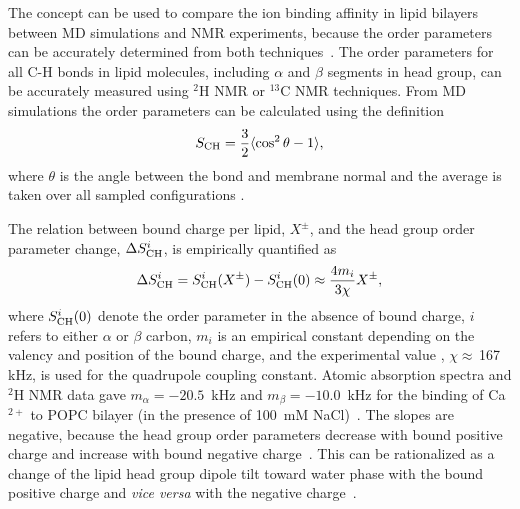 \documentclass[aip,jcp,twocolumn]{revtex4}
\begin{document}
The concept can be used to compare the ion binding affinity in lipid 
bilayers between MD simulations and  NMR experiments, because the order
parameters can be accurately determined from both techniques~\cite{ollila16}.
The order parameters for all C-H bonds in lipid molecules, including
$\alpha$ and $\beta$ segments in head group, can be accurately measured
using $^2$H NMR or $^{13}$C NMR techniques. From MD simulations the
order parameters can be calculated using the definition
\begin{equation}\label{OP}
S_{\rm CH}=\frac{3}{2}\langle \cos^2\theta -1 \rangle,
\end{equation}
where $\theta$ is the angle between the bond and membrane
normal and the average is taken over all sampled configurations \cite{ollila16}.

The relation between bound charge per lipid,  $X^\pm$, and
the head group order parameter change, $\Delta S_{\rm{CH}}^{i}$,
is empirically quantified as~\cite{seelig87,ferreira16}
\begin{equation}\label{OPchangeEQ}
  \Delta S_{\rm{CH}}^{i}= S_{\rm{CH}}^{i}(X^\pm)-S_{\rm{CH}}^{i}(0) \approx \frac{4m_i }{3\chi}X^\pm,
\end{equation}
where $S_{\rm{CH}}^{i}(0)$ denote the order parameter in the absence of bound charge,
$i$ refers to either $\alpha$ or $\beta$ carbon,
$m_i$ is an empirical constant depending on the valency and position of the bound charge,
and the experimental value \cite{seelig77,davis83}, $\chi \approx$\,167\,kHz, is used for the quadrupole coupling constant.
Atomic absorption spectra and $^2$H NMR data gave
$m_\alpha=-20.5$~kHz  and $m_\beta=-10.0$~kHz for the binding of
Ca$^{2+}$ to POPC bilayer (in the presence of 100~mM NaCl)~\cite{altenbach84,ollila16,catte16}.
The slopes are negative, because the head group order parameters
decrease with bound positive charge and increase with bound negative
charge~\cite{ollila16,catte16}. This can be rationalized as a change
of the lipid head group dipole tilt toward water phase with the bound positive
charge and {\it vice versa} with the negative charge~\cite{seelig87}. 
\end{document}
